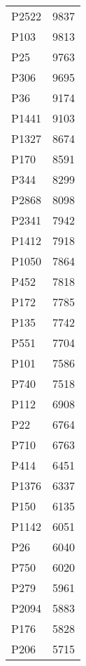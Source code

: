\begin{tabular}{lr}
   P2522 &                         9837 \\
    P103 &                         9813 \\
     P25 &                         9763 \\
    P306 &                         9695 \\
     P36 &                         9174 \\
   P1441 &                         9103 \\
   P1327 &                         8674 \\
    P170 &                         8591 \\
    P344 &                         8299 \\
   P2868 &                         8098 \\
   P2341 &                         7942 \\
   P1412 &                         7918 \\
   P1050 &                         7864 \\
    P452 &                         7818 \\
    P172 &                         7785 \\
    P135 &                         7742 \\
    P551 &                         7704 \\
    P101 &                         7586 \\
    P740 &                         7518 \\
    P112 &                         6908 \\
     P22 &                         6764 \\
    P710 &                         6763 \\
    P414 &                         6451 \\
   P1376 &                         6337 \\
    P150 &                         6135 \\
   P1142 &                         6051 \\
     P26 &                         6040 \\
    P750 &                         6020 \\
    P279 &                         5961 \\
   P2094 &                         5883 \\
    P176 &                         5828 \\
    P206 &                         5715 \\

\end{tabular}

